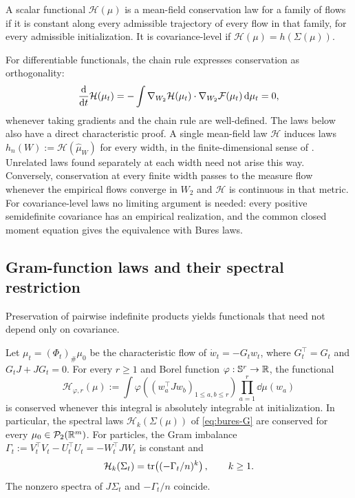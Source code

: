 \begin{definition}\label{def:mean-field-law}
A scalar functional \(\mathcal H(\mu)\) is a mean-field conservation law
for a family of flows if it is constant along every admissible trajectory
of every flow in that family, for every admissible initialization.
It is covariance-level if \(\mathcal H(\mu)=h(\Sigma(\mu))\).
\end{definition}
For differentiable functionals, the chain rule expresses conservation as
orthogonality:
\[
 \frac{\mathrm{d}}{\mathrm{d} t}\mathcal H(\mu_t)
 =-\int\nabla_{W_2}\mathcal H(\mu_t)\cdot
          \nabla_{W_2}\mathcal F(\mu_t)\,\mathrm{d}\mu_t=0, 
\]
whenever taking gradients and the chain rule are well-defined.
The laws below also have a direct characteristic proof.
A single mean-field law \( \mathcal H\) induces laws
\(h_n(W):=\mathcal H(\widehat\mu_W)\) for every width, in the
finite-dimensional sense of \citet{MarcotteGribonvalPeyre2023}.
Unrelated laws found separately at each width need not arise this way.
Conversely, conservation at every finite width passes to the measure flow
whenever the empirical flows converge in \(W_2\) and \(\mathcal H\) is
continuous in that metric. For covariance-level laws no limiting argument is needed:
every positive semidefinite covariance has an empirical realization, and
the common closed moment equation gives the equivalence with Bures laws.

\subsection{Gram-function laws and their spectral restriction}
Preservation of pairwise indefinite products yields functionals
that need not depend only on covariance.
\begin{proposition}
\label{prop:mean-field-conservation-laws}
Let $\mu_t=(\Phi_t)_\#\mu_0$ be the characteristic flow of
$\dot w_t=-G_tw_t$, where $G_t^\top=G_t$ and $G_tJ+JG_t=0$.
For every $r\ge1$ and Borel function $\varphi:\mathbb{S}^r\to\mathbb{R}$,
the functional
\begin{equation}\label{eq:gram-mean-field-law}
 \mathcal H_{\varphi,r}(\mu)
 :=\int\varphi\!\left((w_a^\top Jw_b)_{1\le a,b\le r}\right)
       \prod_{a=1}^r\dd\mu(w_a)
\end{equation}
is conserved whenever this integral is absolutely integrable at
initialization. In particular, the spectral laws
$\mathcal H_k(\Sigma(\mu))$ of \eqref{eq:bures-G}
are conserved for every $\mu_0\in\mathcal P_2(\mathbb{R}^m)$.
For particles, the Gram imbalance
$\Gamma_t:=V_t^\top V_t-U_t^\top U_t=-W_t^\top JW_t$ is constant and
\begin{equation}\label{eq:finite-spectrum-gamma}
 \mathcal H_k(\Sigma_t)=\operatorname{tr}\!\left((-\Gamma_t/n)^k\right),
 \qquad k\ge1.
\end{equation}
The nonzero spectra of $J\Sigma_t$ and $-\Gamma_t/n$ coincide.
\end{proposition}

